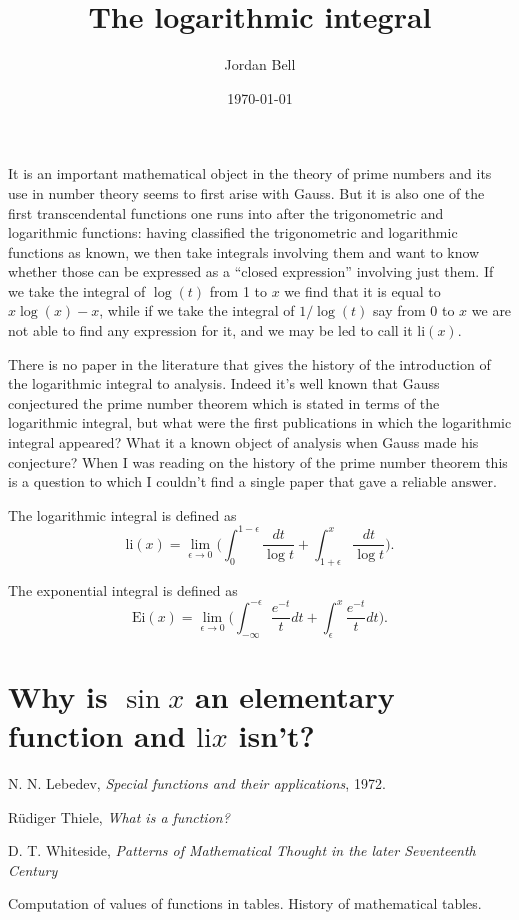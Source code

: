 \documentclass{amsart}
\newcommand{\li}{\mathrm{li}}
\newcommand{\Ei}{\mathrm{Ei}}
\begin{document}
\title{The logarithmic integral}
\author{Jordan Bell}
\date{\today}
\maketitle

It is an important mathematical object in the theory of
prime numbers and its use in number theory seems to first arise with Gauss.
But it is also
one of the first transcendental functions one runs into after the
trigonometric and logarithmic functions: having classified the
trigonometric and logarithmic functions as known, we then take
integrals involving them and want to know whether those can be
expressed as a ``closed expression'' involving just them. If we take the
integral of $\log(t)$ from 1 to $x$ we find that it is equal to
$x\log(x)-x$,
while if we take the integral of $1/\log(t)$ say from 0 to $x$ we are not
able to find any expression for it, and we may be led to call it
$\li(x)$.

There is no paper in the literature that gives the history of the introduction
of the logarithmic integral to analysis. Indeed it's well known that Gauss
conjectured the prime number theorem which is stated in terms of the logarithmic
integral, but what were the first publications in which the logarithmic integral
appeared? What it a known object of analysis when Gauss made his conjecture?
When I was reading on the history of the prime number theorem this is a
question to which I couldn't find a single paper that gave a reliable answer.


The logarithmic integral is defined as
\[
\li(x)=\lim_{\epsilon \to 0} \Big( \int_0^{1-\epsilon} \frac{dt}{\log t}
+\int_{1+\epsilon}^x \frac{dt}{\log t}\Big).
\]

The exponential integral is defined as
\[
\Ei(x)=\lim_{\epsilon \to 0} \Big( \int_{-\infty}^{-\epsilon}
\frac{e^{-t}}{t} dt + \int_{\epsilon}^x \frac{e^{-t}}{t} dt\Big).
\]

\section{Why is $\sin x$ an elementary function and $\li x$ isn't?}
N. N. Lebedev, {\em Special functions and their applications}, 1972.

R\"udiger Thiele, {\em What is a function?}

D. T. Whiteside, {\em Patterns of Mathematical Thought 
in the later Seventeenth Century}

Computation of values of functions in tables. History of mathematical tables.
\end{document}
